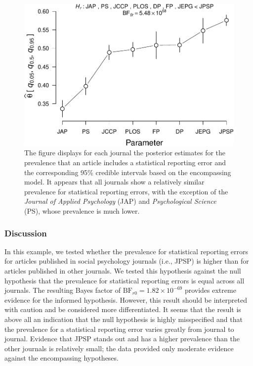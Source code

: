 \documentclass[
  english,
  man,floatsintext]{apa6}
\begin{document}
\begin{figure}
\centering
\includegraphics{Rpackage_paper_files/figure-latex/journals-1.pdf}
\caption{\label{fig:journals}The figure displays for each journal the posterior estimates for the prevalence that an article includes a statistical reporting error and the corresponding 95\% credible intervals based on the encompassing model. It appears that all journals show a relatively similar prevalence for statistical reporting errors, with the exception of the \emph{Journal of Applied Psychology} (JAP) and \emph{Psychological Science} (PS), whose prevalence is much lower.}
\end{figure}

\hypertarget{discussion-1}{%
\subsubsection{Discussion}\label{discussion-1}}

In this example, we tested whether the prevalence for statistical reporting errors for articles published in social psychology journals (i.e., JPSP) is higher than for articles published in other journals. We tested this hypothesis against the null hypothesis that the prevalence for statistical reporting errors is equal across all journals. The resulting Bayes factor of \(\text{BF}_{r0} = 1.82 \times 10^{-69}\) provides extreme evidence for the informed hypothesis. However, this result should be interpreted with caution and be considered more differentiated. It seems that the result is above all an indication that the null hypothesis is highly misspecified and that the prevalence for a statistical reporting error varies greatly from journal to journal. Evidence that JPSP stands out and has a higher prevalence than the other journals is relatively small; the data provided only moderate evidence against the encompassing hypotheses.
\end{document}
